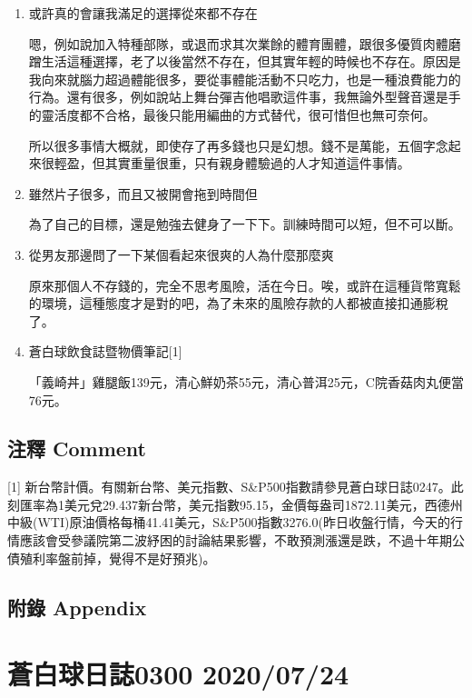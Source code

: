 \documentclass[a5paper, 11pt
]{book}
\begin{document}
\begin{enumerate}
\def\labelenumi{\arabic{enumi}.}
\item
  或許真的會讓我滿足的選擇從來都不存在

  嗯，例如說加入特種部隊，或退而求其次業餘的體育團體，跟很多優質肉體磨蹭生活這種選擇，老了以後當然不存在，但其實年輕的時候也不存在。原因是我向來就腦力超過體能很多，要從事體能活動不只吃力，也是一種浪費能力的行為。還有很多，例如說站上舞台彈吉他唱歌這件事，我無論外型聲音還是手的靈活度都不合格，最後只能用編曲的方式替代，很可惜但也無可奈何。

  所以很多事情大概就，即使存了再多錢也只是幻想。錢不是萬能，五個字念起來很輕盈，但其實重量很重，只有親身體驗過的人才知道這件事情。
\item
  雖然片子很多，而且又被開會拖到時間但

  為了自己的目標，還是勉強去健身了一下下。訓練時間可以短，但不可以斷。
\item
  從男友那邊問了一下某個看起來很爽的人為什麼那麼爽

  原來那個人不存錢的，完全不思考風險，活在今日。唉，或許在這種貨幣寬鬆的環境，這種態度才是對的吧，為了未來的風險存款的人都被直接扣通膨稅了。
\item
  蒼白球飲食誌暨物價筆記{[}1{]}

  「義崎丼」雞腿飯139元，清心鮮奶茶55元，清心普洱25元，C院香菇肉丸便當76元。
\end{enumerate}

\hypertarget{ux6ce8ux91cb-comment-46}{%
\subsection{注釋 Comment}\label{ux6ce8ux91cb-comment-46}}

{[}1{]}
新台幣計價。有關新台幣、美元指數、S\&P500指數請參見蒼白球日誌0247。此刻匯率為1美元兌29.437新台幣，美元指數95.15，金價每盎司1872.11美元，西德州中級(WTI)原油價格每桶41.41美元，S\&P500指數3276.0(昨日收盤行情，今天的行情應該會受參議院第二波紓困的討論結果影響，不敢預測漲還是跌，不過十年期公債殖利率盤前掉，覺得不是好預兆)。

\hypertarget{ux9644ux9304-appendix-46}{%
\subsection{附錄 Appendix}\label{ux9644ux9304-appendix-46}}

\hypertarget{ux84bcux767dux7403ux65e5ux8a8c0300-20200724}{%
\section{蒼白球日誌0300
2020/07/24}\label{ux84bcux767dux7403ux65e5ux8a8c0300-20200724}}
\end{document}
